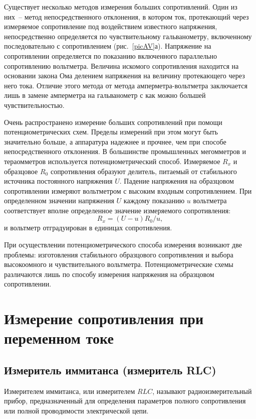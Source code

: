 \documentclass[pscyr]{hedwork}
\newcommand{\Pic}[1]{\ref{pic#1}}
\newcommand{\pic}[1]{рис.~\Pic{#1}}
\begin{document}
  Существует несколько методов измерения больших сопротивлений. Один из них~--
  метод непосредственного отклонения, в котором ток, протекающий через
  измеряемое сопротивление под воздействием известного напряжения,
  непосредственно определяется по чувствительному гальванометру, включенному
  последовательно с сопротивлением (\pic{AV}а). Напряжение на сопротивлении
  определяется по показанию включенного параллельно сопротивлению вольтметра.
  Величина искомого сопротивления находится на основании закона Ома делением
  напряжения на величину протекающего через него тока. Отличие этого метода от
  метода амперметра-вольтметра заключается лишь в замене амперметра на
  гальванометр с как можно большей чувствительностью.
  
  \bigskip

  Очень распространено измерение больших сопротивлений при помощи
  потенциометрических схем. Пределы измерений при этом могут быть значительно
  больше, а аппаратура надежнее и прочнее, чем при способе непосредственного
  отклонения. В большинстве промышленных мегомметров и тераомметров используется
  потенциометрический способ. Измеряемое \( R_x \) и образцовое \( R_0 \)
  сопротивления образуют делитель, питаемый от стабильного источника постоянного
  напряжения \( U \). Падение напряжения на образцовом сопротивлении измеряют
  вольтметром с высоким входным сопротивлением. При определенном значении
  напряжения \( U \) каждому показанию \( u \) вольтметра соответствует вполне
  определенное значение измеряемого сопротивления:
  \[
    R_x = (U - u) R_0 / u,
  \]
  и вольтметр отградуирован в единицах сопротивления.
  
  При осуществлении потенциометрического способа измерения возникают две
  проблемы: изготовления стабильного образцового сопротивления и выбора
  высокоомного и чувствительного вольтметра. Потенциометрические схемы
  различаются лишь по способу измерения напряжения на образцовом сопротивлении.

  \section{Измерение сопротивления при переменном токе}
  
  \subsection[Измеритель иммитанса]{Измеритель иммитанса (измеритель RLC)}
  
  Измерителем иммитанса, или измерителем \( RLC \), называют радиоизмерительный
  прибор, предназначенный для определения параметров полного сопротивления или
  полной проводимости электрической цепи.
  
\end{document}
